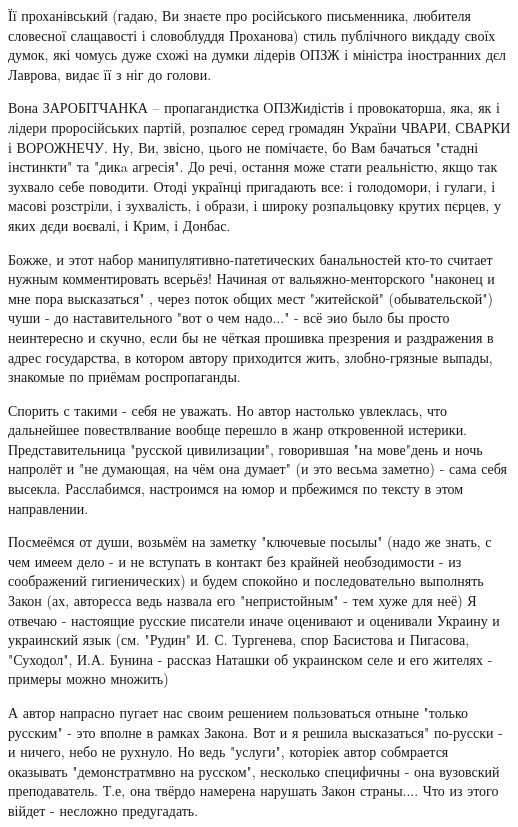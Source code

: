\begin{itemize}
Її проханівський (гадаю, Ви
знаєте про російського письменника, любителя словесної слащавості і словоблуддя
Проханова) стиль публічного викдаду своїх думок, які чомусь дуже схожі на думки
лідерів ОПЗЖ і міністра іностранних дєл Лаврова, видає її з ніг до голови. 

Вона ЗАРОБІТЧАНКА – пропагандистка ОПЗЖидістів і провокаторша, яка, як і лідери
проросійських партій, розпалює серед громадян України ЧВАРИ, СВАРКИ і
ВОРОЖНЕЧУ. Ну, Ви, звісно, цього не помічаєте, бо Вам бачаться "стадні
інстинкти" та "дикa агресія". До речі, остання може стати реальністю, якщо так
зухвало себе поводити. Отоді українці пригадають все: і голодомори, і гулаги, і
масові розстріли, і зухвалість, і образи, і широку розпальцовку крутих пєрцев,
у яких дєди воєвалі, і Крим, і Донбас.


Божже, и этот набор манипулятивно-патетических банальностей кто-то считает
нужным комментировать всерьёз! Начиная от вальяжно-менторского "наконец и мне
пора высказаться" , через поток общих мест "житейской" (обывательской") чуши -
до наставительного "вот о чем надо..." - всё эио было бы просто неинтересно и
скучно, если бы не чёткая прошивка презрения и раздражения в адрес государства,
в котором автору приходится жить, злобно-грязные выпады, знакомые по приёмам
роспропаганды. 

Спорить с такими - себя не уважать. Но автор настолько увлеклась, что
дальнейшее повествлвание вообще перешло в жанр откровенной истерики.
Представительница "русской цивилизации", говорившая "на мове"день и ночь
напролёт и "не думающая, на чём она думает" (и это весьма заметно) - сама себя
высекла. Расслабимся, настроимся на юмор и прбежимся по тексту в этом
направлении. 

Посмеёмся от души, возьмём на заметку "ключевые посылы" (надо же знать, с чем
имеем дело - и не вступать в контакт без крайней необзодимости - из соображений
гигиенических) и будем спокойно и последовательно выполнять Закон (ах,
авторесса ведь назвала его "непристойным" - тем хуже для неё) Я отвечаю -
настоящие русские писатели иначе оценивают и оценивали Украину и украинский
язык (см. "Рудин" И. С. Тургенева, спор Басистова и Пигасова, "Суходол", И.А.
Бунина - рассказ Наташки об украинском селе и его жителях - примеры можно
множить) 

А автор напрасно пугает нас своим решением пользоваться отныне "только русским"
- это вполне в рамках Закона. Вот и я решила высказаться" по-русски - и ничего,
небо не рухнуло. Но ведь "услуги", которіек автор собмрается оказывать
"демонстратмвно на русском", несколько специфичны - она вузовский
преподаватель. Т.е, она твёрдо намерена нарушать Закон страны.... Что из этого
війдет - несложно предугадать. 


\end{itemize}
